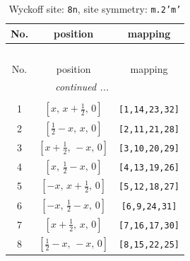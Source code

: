 \documentclass[fleqn,8pt]{jsarticle}
\begin{document}
\begin{longtable}{ccc}
\caption{Wyckoff site: {\tt 8n}, site symmetry: {\tt m.2'm'}}
 \\
 \hline \hline
No. & position & mapping \\ \hline \endfirsthead

\multicolumn{2}{l}{\tablename\ \thetable{}} \\
 \hline \hline
No. & position & mapping \\ \hline \endhead

 \hline \hline
\multicolumn{2}{r}{\footnotesize\it continued ...} \\ \endfoot

 \hline \hline
\multicolumn{2}{r}{} \\ \endlastfoot

1 & $\left[ x,\, x + \frac{1}{2},\, 0 \right]$ & {\tt [1,14,23,32]} \\ \hline
2 & $\left[ \frac{1}{2} - x,\, x,\, 0 \right]$ & {\tt [2,11,21,28]} \\ \hline
3 & $\left[ x + \frac{1}{2},\, - x,\, 0 \right]$ & {\tt [3,10,20,29]} \\ \hline
4 & $\left[ x,\, \frac{1}{2} - x,\, 0 \right]$ & {\tt [4,13,19,26]} \\ \hline
5 & $\left[ - x,\, x + \frac{1}{2},\, 0 \right]$ & {\tt [5,12,18,27]} \\ \hline
6 & $\left[ - x,\, \frac{1}{2} - x,\, 0 \right]$ & {\tt [6,9,24,31]} \\ \hline
7 & $\left[ x + \frac{1}{2},\, x,\, 0 \right]$ & {\tt [7,16,17,30]} \\ \hline
8 & $\left[ \frac{1}{2} - x,\, - x,\, 0 \right]$ & {\tt [8,15,22,25]} \\
\end{longtable}
\renewcommand{\arraystretch}{1.2}
\end{document}
